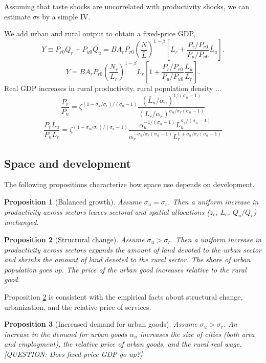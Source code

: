 \documentclass[12pt]{article}
\newtheorem{proposition}{Proposition}
\begin{document}
Assuming that taste shocks are uncorrelated with productivity shocks, we can estimate $\sigma$s by a simple IV.

We add urban and rural output to obtain a fixed-price GDP,
\begin{equation}
	Y \equiv
	P_{r0}Q_r + P_{u0}Q_u
	=
	B A_r P_{r0}\left(\frac {N}
	{{\bar L}}
\right)^{1-\beta}
\left[
L_r
+
\frac{P_r/P_{r0}}{P_u/P_{u0}}
\bar L_u\right].
\end{equation}
\[
	Y =
	B A_r P_{r0}\left(\frac {N_r}
	{L_r}
\right)^{1-\beta} L_r
\left[
1
+
\frac{P_r/P_{r0}}{P_u/P_{u0}}
\frac{\bar L_u}{L_r}
\right].
\]
Real GDP increases in rural productivity, rural population density ...
\[
\frac {P_r}{P_u}
=
\zeta^{(1-\sigma_u/\sigma_r)/(\sigma_u-1)}
\frac {(\bar L_u/\alpha_u)^{1/(\sigma_u-1)}}
{(L_r/\alpha_r)^{\sigma_u/\sigma_r(\sigma_u-1)}}
\]
\[
\frac {P_r \bar L_u}{P_uL_r}
=
\zeta^{(1-\sigma_u/\sigma_r)/(\sigma_u-1)}
\frac {\alpha_u^{-1/(\sigma_u-1)}\bar L_u^{\sigma_u/(\sigma_u-1)}}
{\alpha_r^{-\sigma_u/\sigma_r(\sigma_u-1)}
L_r^{1+\sigma_u/\sigma_r(\sigma_u-1)}}
\]

\subsection{Space and development}
The following propositions characterize how space use depends on development.
\begin{proposition}[Balanced growth]\label{prop:balanced_growth}
Assume $\sigma_u=\sigma_r$. Then a uniform increase in productivity across sectors leaves sectoral and spatial allocations ($z_c$, $L_c$, $Q_u/Q_r$) unchanged.
\end{proposition}

\begin{proposition}[Structural change]\label{prop:comparative_static}
Assume $\sigma_u>\sigma_r$. Then a uniform increase in productivity across sectors expands the amount of land devoted to the urban sector and shrinks the amount of land devoted to the rural sector. The share of urban population goes up. The price of the urban good increases relative to the rural good.
\end{proposition}

Proposition \ref{prop:comparative_static} is consistent with the empirical facts about structural change, urbanization, and the relative price of services.

\begin{proposition}[Increased demand for urban goods]\label{prop:demand}
Assume $\sigma_u>\sigma_r$. An increase in the demand for urban goods $\alpha_u$ increases the size of cities (both area and employment), the relative price of urban goods, and the rural real wage. [QUESTION: Does fixed-price GDP go up?]
\end{proposition}
\end{document}
